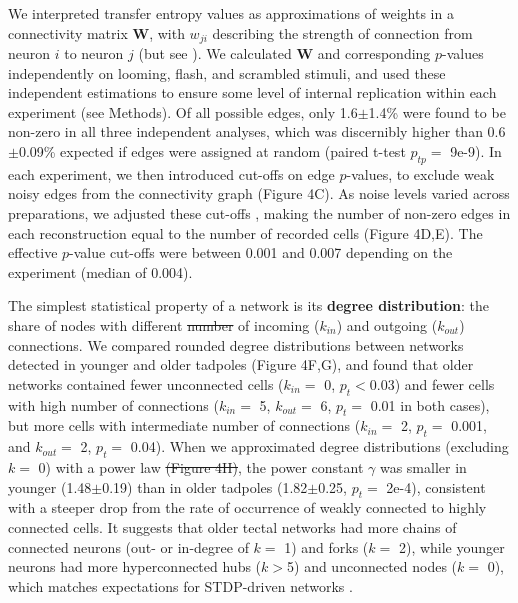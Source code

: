 \documentclass{article}
\providecommand{\DIFaddtex}[1]{{\protect\color{blue}{#1}}} %
\providecommand{\DIFdeltex}[1]{{\protect\color{red}\sout{#1}}}                      %
\providecommand{\DIFaddbegin}{} %
\providecommand{\DIFaddend}{} %
\providecommand{\DIFdelbegin}{} %
\providecommand{\DIFdelend}{} %
\providecommand{\DIFadd}[1]{\texorpdfstring{\DIFaddtex{#1}}{#1}} %
\providecommand{\DIFdel}[1]{\texorpdfstring{\DIFdeltex{#1}}{}} %
\newcommand{\DIFscaledelfig}{0.5}
\newlength{\DIFdelgraphicswidth} %
\newlength{\DIFdelgraphicsheight} %
\newcommand{\DIFaddincludegraphics}[2][]{{\color{blue}\fbox{\DIFOincludegraphics[#1]{#2}}}} %
\newcommand{\DIFdelincludegraphics}[2][]{%
\sbox{\DIFdelgraphicsbox}{\DIFOincludegraphics[#1]{#2}}%
\settoboxwidth{\DIFdelgraphicswidth}{\DIFdelgraphicsbox} %
\settoboxtotalheight{\DIFdelgraphicsheight}{\DIFdelgraphicsbox} %
\scalebox{\DIFscaledelfig}{%
\parbox[b]{\DIFdelgraphicswidth}{\usebox{\DIFdelgraphicsbox}\\[-\baselineskip] \rule{\DIFdelgraphicswidth}{0em}}\llap{\resizebox{\DIFdelgraphicswidth}{\DIFdelgraphicsheight}{%
\setlength{\unitlength}{\DIFdelgraphicswidth}%
\begin{picture}(1,1)%
\thicklines\linethickness{2pt} %
{\color[rgb]{1,0,0}\put(0,0){\framebox(1,1){}}}%
{\color[rgb]{1,0,0}\put(0,0){\line( 1,1){1}}}%
{\color[rgb]{1,0,0}\put(0,1){\line(1,-1){1}}}%
\end{picture}%
}\hspace*{3pt}}} %
} %
\DeclareRobustCommand{\DIFaddbegin}{\DIFOaddbegin \let\includegraphics\DIFaddincludegraphics} %
\DeclareRobustCommand{\DIFaddend}{\DIFOaddend \let\includegraphics\DIFOincludegraphics} %
\DeclareRobustCommand{\DIFdelbegin}{\DIFOdelbegin \let\includegraphics\DIFdelincludegraphics} %
\DeclareRobustCommand{\DIFdelend}{\DIFOaddend \let\includegraphics\DIFOincludegraphics} %
\begin{document}
We interpreted transfer entropy values as approximations of weights in a connectivity matrix $\mathbf{W}$, with $w_{ji}$ describing the strength of connection from neuron $i$ to neuron $j$ (but see \citealt{mehler2018lure}). We calculated $\mathbf{W}$ and corresponding $p$-values independently on looming, flash, and scrambled stimuli, and used these independent estimations to ensure some level of internal replication within each experiment (see Methods). Of all possible edges, only 1.6$\pm$1.4\% were found to be non-zero in all three independent analyses, which was discernibly higher than 0.6$\pm$0.09\% expected if edges were assigned at random (paired t-test $p_{tp}=$ 9e-9). In each experiment, we then introduced cut-offs on edge $p$-values, to exclude weak noisy edges from the connectivity graph (Figure 4C). As noise levels varied across preparations, we adjusted these cut-offs \citep{stetter2012te}, making the number of non-zero edges in each reconstruction equal to the number of recorded cells (Figure 4D,E). The effective $p$-value cut-offs were between 0.001 and 0.007 depending on the experiment (median of 0.004). \DIFaddbegin \DIFadd{Note also that the results described below are relatively insensitive to the precise assumptions of this approach to weigh thresholding.
}\DIFaddend 

The simplest statistical property of a network is its \textbf{degree distribution}: the share of nodes with different \DIFdelbegin \DIFdel{number }\DIFdelend \DIFaddbegin \DIFadd{numbers }\DIFaddend of incoming ($k_{in}$) and outgoing ($k_{out}$) connections. We compared rounded degree distributions between networks detected in younger and older tadpoles (Figure 4F,G), and found that older networks contained fewer unconnected cells ($k_{in}=$ 0, $p_t<$0.03) and fewer cells with high number of connections ($k_{in}=$ 5, $k_{out}=$ 6, $p_t=$ 0.01 in both cases), but more cells with intermediate number of connections ($k_{in}=$ 2, $p_t=$ 0.001, and $k_{out}=$ 2, $p_t=$ 0.04). When we approximated degree distributions (excluding $k=$ 0) with a power law \DIFdelbegin \DIFdel{(Figure 4H)}\DIFdelend \DIFaddbegin \DIFadd{$P(k) \sim k^{-\gamma}$}\DIFaddend , the power constant $\gamma$ was smaller in younger (1.48$\pm$0.19) than in older tadpoles (1.82$\pm$0.25, $p_t=$ 2e-4\DIFaddbegin \DIFadd{; Figure 4H}\DIFaddend ), consistent with a steeper drop from the rate of occurrence of weakly connected to highly connected cells. It suggests that older tectal networks had more chains of connected neurons (out- or in-degree of $k=$ 1) and forks ($k=$ 2), while younger neurons had more hyperconnected hubs ($k>$5) and unconnected nodes ($k=$ 0), which matches expectations for STDP-driven networks \citep{fiete2010chains}.
\end{document}
